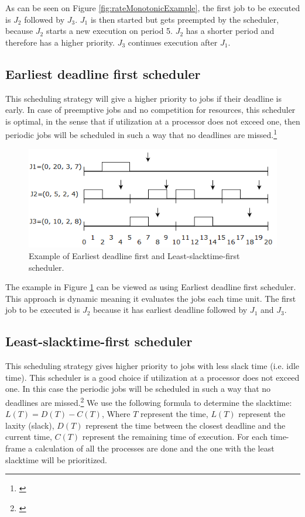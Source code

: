 \noindent As can be seen on Figure \ref{fig:rateMonotonicExample}, the first job to be executed is $J_2$ followed by $J_3$. $J_1$ is then started but gets preempted by the scheduler, because $J_2$ starts a new execution on period 5. $J_2$ has a shorter period and therefore has a higher priority. $J_3$ continues execution after $J_1$.

\subsection{Earliest deadline first scheduler}
\noindent This scheduling strategy will give a higher priority to jobs if their deadline is
early. In case of preemptive jobs and no competition for resources, this scheduler
is optimal, in the sense that if utilization at a processor does not exceed one, then
periodic jobs will be scheduled in such a way that no deadlines are missed.\footnote{\cite[p.~184]{Fokkink1965}}

\begin{figure}[!ht]
	\centering
	\includegraphics[scale=0.5]{realTimeComputing/fig/EarliestDeadlineFirst.png}
	\caption{Example of Earliest deadline first and Least-slacktime-first scheduler.}
	\label{fig:EarliestDeadlineFirstAndLeastSlacktimeFirstSchedulerExample}
\end{figure}

\noindent The example in Figure \ref{fig:EarliestDeadlineFirstAndLeastSlacktimeFirstSchedulerExample} can be viewed as using Earliest deadline first scheduler. This approach is dynamic meaning it evaluates the jobs each time unit. The first job to be executed is $J_2$ because it has earliest deadline followed by $J_1$ and $J_3$.

\subsection{Least-slacktime-first scheduler}
This scheduling strategy gives higher priority to jobs with less slack time (i.e. idle time). This scheduler is a good choice if utilization at a processor does not exceed one. In this case the periodic jobs will be scheduled in such a way that no deadlines are missed.\footnote{\cite[p.~184]{Fokkink1965}} We use the following formula to determine the slacktime: $L(T)=D(T)-C(T)$, Where $T$ represent the time, $L(T)$ represent the laxity (slack), $D(T)$ represent the time between the closest deadline and the current time, $C(T)$ represent the remaining time of execution. For each time-frame a calculation of all the processes are done and the one with the least slacktime will be prioritized.

